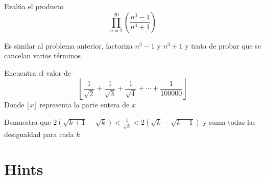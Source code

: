 \documentclass[11pt]{scrartcl}
\begin{document}
    \begin{problem}
        Evalúa el producto
        \[\prod_{n=2}^{20} \left(\frac{n^3-1}{n^3+1}\right)\]
        \begin{hint}
            Es similar al problema anterior, factoriza $n^3-1$ y $n^3+1$ y trata de probar que se cancelan varios términos
        \end{hint}
    \end{problem}\hspace{0.2cm}
    
\begin{problem}
    Encuentra el valor de \[\left \lfloor \frac{1}{\sqrt{2}}+\frac{1}{\sqrt{3}}+\frac{1}{\sqrt{4}}+\cdots+\frac{1}{100000}\right \rfloor\]
    Donde $\lfloor x\rfloor$ representa la parte entera de $x$
    \begin{hint}
        Demuestra que $2(\sqrt{k+1}-\sqrt{k})<\frac{1}{\sqrt{k}}<2(\sqrt{k}-\sqrt{k-1})$ y suma todas las desigualdad para cada $k$
    \end{hint}
\end{problem}
\bigskip
\clearpage
\section{Hints}
\begin{enumerate}
  
\end{enumerate}
\end{document}
